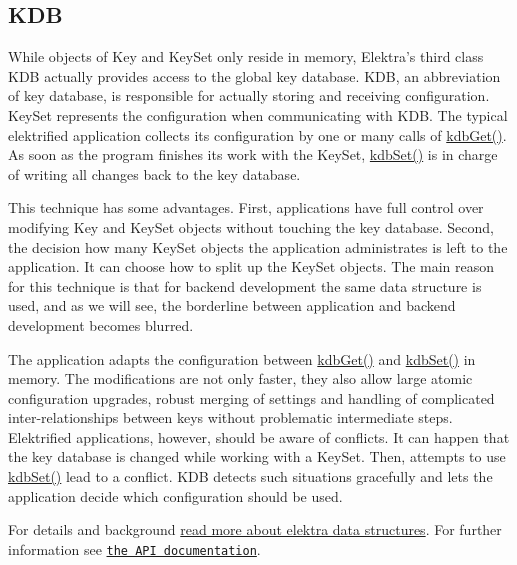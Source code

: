 \subsection*{K\+D\+B}

While objects of {\ttfamily Key} and {\ttfamily Key\+Set} only reside in memory, Elektra's third class {\ttfamily K\+D\+B} actually provides access to the global key database. {\ttfamily K\+D\+B}, an abbreviation of key database, is responsible for actually storing and receiving configuration. {\ttfamily Key\+Set} represents the configuration when communicating with {\ttfamily K\+D\+B}. The typical elektrified application collects its configuration by one or many calls of {\ttfamily \hyperlink{group__kdb_ga28e385fd9cb7ccfe0b2f1ed2f62453a1}{kdb\+Get()}}. As soon as the program finishes its work with the {\ttfamily Key\+Set}, {\ttfamily \hyperlink{group__kdb_ga11436b058408f83d303ca5e996832bcf}{kdb\+Set()}} is in charge of writing all changes back to the key database.

This technique has some advantages. First, applications have full control over modifying {\ttfamily Key} and {\ttfamily Key\+Set} objects without touching the key database. Second, the decision how many {\ttfamily Key\+Set} objects the application administrates is left to the application. It can choose how to split up the {\ttfamily Key\+Set} objects. The main reason for this technique is that for backend development the same data structure is used, and as we will see, the borderline between application and backend development becomes blurred.

The application adapts the configuration between {\ttfamily \hyperlink{group__kdb_ga28e385fd9cb7ccfe0b2f1ed2f62453a1}{kdb\+Get()}} and {\ttfamily \hyperlink{group__kdb_ga11436b058408f83d303ca5e996832bcf}{kdb\+Set()}} in memory. The modifications are not only faster, they also allow large atomic configuration upgrades, robust merging of settings and handling of complicated inter-\/relationships between keys without problematic intermediate steps. Elektrified applications, however, should be aware of conflicts. It can happen that the key database is changed while working with a {\ttfamily Key\+Set}. Then, attempts to use {\ttfamily \hyperlink{group__kdb_ga11436b058408f83d303ca5e996832bcf}{kdb\+Set()}} lead to a conflict. {\ttfamily K\+D\+B} detects such situations gracefully and lets the application decide which configuration should be used.

For details and background \hyperlink{md_doc_help_elektra-data-structures_doc_help_elektra-data-structures_md}{read more about elektra data structures}. For further information see \href{http://doc.libelektra.org/api/current/html/}{\tt the A\+P\+I documentation}. 